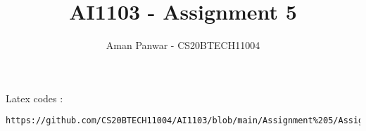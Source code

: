 \documentclass[journal,12pt,twocolumn]{IEEEtran}
\DeclareMathOperator*{\Res}{Res}
\begin{document}
\newcommand{\BEQA}{\begin{eqnarray}}
\newcommand{\EEQA}{\end{eqnarray}}
\newcommand{\define}{\stackrel{\triangle}{=}}

\raggedbottom
\setlength{\parindent}{0pt}
\providecommand{\mbf}{\mathbf}
\providecommand{\pr}[1]{\ensuremath{\Pr\left(#1\right)}}
\providecommand{\qfunc}[1]{\ensuremath{Q\left(#1\right)}}
\providecommand{\sbrak}[1]{\ensuremath{{}\left[#1\right]}}
\providecommand{\lsbrak}[1]{\ensuremath{{}\left[#1\right.}}
\providecommand{\rsbrak}[1]{\ensuremath{{}\left.#1\right]}}
\providecommand{\brak}[1]{\ensuremath{\left(#1\right)}}
\providecommand{\lbrak}[1]{\ensuremath{\left(#1\right.}}
\providecommand{\rbrak}[1]{\ensuremath{\left.#1\right)}}
\providecommand{\cbrak}[1]{\ensuremath{\left\{#1\right\}}}
\providecommand{\lcbrak}[1]{\ensuremath{\left\{#1\right.}}
\providecommand{\rcbrak}[1]{\ensuremath{\left.#1\right\}}}
\theoremstyle{remark}
\newtheorem{rem}{Remark}
\newcommand{\sgn}{\mathop{\mathrm{sgn}}}
\providecommand{\abs}[1]{\vert#1\vert}
\providecommand{\res}[1]{\Res\displaylimits_{#1}} 
\providecommand{\norm}[1]{\lVert#1\rVert}
\providecommand{\mtx}[1]{\mathbf{#1}}
\providecommand{\mean}[1]{E[ #1 ]}
\providecommand{\fourier}{\overset{\mathcal{F}}{ \rightleftharpoons}}
\providecommand{\system}{\overset{\mathcal{H}}{ \longleftrightarrow}}
\newcommand{\solution}{\noindent \textbf{Solution: }}
\newcommand{\cosec}{\,\text{cosec}\,}
\providecommand{\dec}[2]{\ensuremath{\overset{#1}{\underset{#2}{\gtrless}}}}
\newcommand{\myvec}[1]{\ensuremath{\begin{pmatrix}#1\end{pmatrix}}}
\newcommand{\mydet}[1]{\ensuremath{\begin{vmatrix}#1\end{vmatrix}}}
\makeatletter
{}
\makeatother
\let\StandardTheFigure\thefigure
\let\vec\mathbf
\renewcommand{\thefigure}{\theproblem}
\def\putbox#1#2#3{\makebox[0in][l]{\makebox[#1][l]{}\raisebox{\baselineskip}[0in][0in]{\raisebox{#2}[0in][0in]{#3}}}}
     \def\rightbox#1{\makebox[0in][r]{#1}}
     \def\centbox#1{\makebox[0in]{#1}}
     \def\topbox#1{\raisebox{-\baselineskip}[0in][0in]{#1}}
     \def\midbox#1{\raisebox{-0.5\baselineskip}[0in][0in]{#1}}
\vspace{3cm}
\title{AI1103 - Assignment 5}
\author{Aman Panwar - CS20BTECH11004}
\maketitle
\newpage
\bigskip
\renewcommand{\thefigure}{\theenumi}
\renewcommand{\thetable}{\theenumi}
%
Latex codes : 
%
\begin{lstlisting}
https://github.com/CS20BTECH11004/AI1103/blob/main/Assignment%205/Assignment%205.tex
\end{lstlisting}
\end{document}
